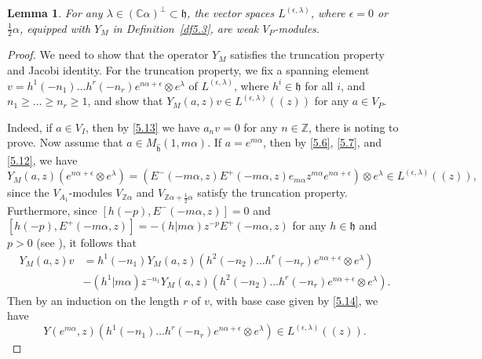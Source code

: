 \documentclass[12pt,a4paper,reqno]{amsart}
\numberwithin{equation}{section}
\numberwithin{equation}{section}
\newtheorem{lm}[thm]{Lemma}
\theoremstyle{definition}
\newcommand{\Z}{\mathbb{Z}}
\def \C {\mathbb{C}}
\def\la{\lambda}
\def \al{\alpha}
\def \h {\mathfrak{h}}
\def\ds{\dots}
\def\o{\otimes}
\begin{document}
	\begin{lm}\label{lm5.4}
		For any $\la\in (\C\al)^\perp\subset \h$, the vector spaces $L^{(\epsilon,\la)}$, where $\epsilon=0$ or $\frac{1}{2}\al$, equipped with $Y_M$ in Definition~\ref{df5.3}, are weak $V_P$-modules. 
	\end{lm}
	\begin{proof}
		We need to show that  the operator $Y_M$ satisfies the truncation property and Jacobi identity.
		For the truncation property, we fix a spanning element $v=h^1(-n_1)\ds h^r(-n_r)e^{n\al+\epsilon}\o e^\la$ of $L^{(\epsilon,\la)}$, where $h^i\in \h$ for all $i$, and $n_1\geq \ds \geq n_r\geq 1$, and show that $Y_M (a,z)v\in L^{(\epsilon,\la)}((z))$ for any $a\in V_P$.
		
		Indeed, if $a\in V_I$, then by \eqref{5.13} we have $a_nv=0$ for any $n\in \Z$, there is noting to prove. Now assume that $a\in M_{\hat{\h}}(1,m\al)$. If $a=e^{m\al}$, then by \eqref{5.6}, \eqref{5.7}, and \eqref{5.12}, we have 
		\begin{equation}\label{5.14}
			Y_M(a,z) (e^{n\al+\epsilon}\o e^\la)=(E^-(-m\al,z)E^+(-m\al,z)e_{m\al}z^{m\al} e^{n\al+\epsilon})\o e^\la\in L^{(\epsilon,\la)}((z)),
		\end{equation}
		since the $V_{A_1}$-modules $V_{\Z\al}$ and $V_{\Z\al+\frac{1}{2}\al}$ satisfy the truncation property. Furthermore, since $[h(-p),E^-(-m\al,z)]=0$ and $[h(-p),E^+(-m\al,z)]=-(h|m\al)z^{-p} E^+(-m\al,z)$ for any $h\in \h$ and $p>0$ (see \cite{FLM,LL}), it follows that 
		\begin{align*}
			Y_M(a,z)v&=h^1(-n_1) Y_M(a,z) (h^2(-n_2)\ds h^r(-n_r)e^{n\al+\epsilon}\o e^\la)\\
			&-(h^1|m\al) z^{-n_1}Y_M(a,z) (h^2(-n_2)\ds h^r(-n_r)e^{n\al+\epsilon}\o e^\la).
		\end{align*}
		Then by an induction on the length $r$ of $v$, with base case given by \eqref{5.14}, we have
		\begin{equation} \label{5.15}
			Y(e^{m\al},z) \left(h^1(-n_1)\ds h^r(-n_r)e^{n\al+\epsilon}\o e^\la\right)\in L^{(\epsilon,\la)}((z)). 
		\end{equation}
		

\end{proof}
\end{document}
